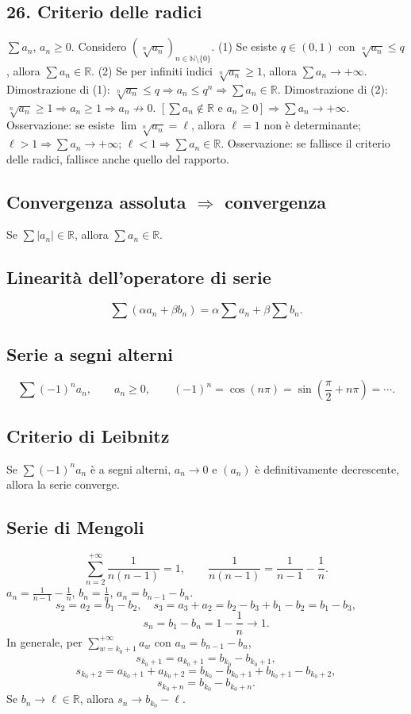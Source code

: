 \documentclass[11pt,a4paper]{article}
\newcommand{\R}{\mathbb R}\newcommand{\N}{\mathbb N}\newcommand{\pagina}[1]{\clearpage}
\begin{document}
\subsection*{26. Criterio delle radici}
$\sum a_n$, $a_n\ge0$. Considero $(\sqrt[n]{a_n})_{n\in\N\setminus\{0\}}$.
(1) Se esiste $q\in(0,1)$ con $\sqrt[n]{a_n}\le q$, allora $\sum a_n\in\R$.
(2) Se per infiniti indici $\sqrt[n]{a_n}\ge1$, allora $\sum a_n\to+\infty$.
Dimostrazione di (1): $\sqrt[n]{a_n}\le q\Rightarrow a_n\le q^n\Rightarrow\sum a_n\in\R$.
Dimostrazione di (2): $\sqrt[n]{a_n}\ge1\Rightarrow a_n\ge1\Rightarrow a_n\not\to0$. $[\sum a_n\notin\R\text{ e }a_n\ge0]\Rightarrow\sum a_n\to+\infty$.
Osservazione: se esiste $\lim\sqrt[n]{a_n}=\ell$, allora $\ell=1$ non è determinante; $\ell>1\Rightarrow\sum a_n\to+\infty$; $\ell<1\Rightarrow\sum a_n\in\R$.
Osservazione: se fallisce il criterio delle radici, fallisce anche quello del rapporto.
\subsection*{Convergenza assoluta $\Rightarrow$ convergenza}
Se $\sum|a_n|\in\R$, allora $\sum a_n\in\R$.
\subsection*{Linearità dell'operatore di serie}
\[\sum(\alpha a_n+\beta b_n)=\alpha\sum a_n+\beta\sum b_n.\]
\subsection*{Serie a segni alterni}
\[\sum(-1)^na_n,\qquad a_n\ge0,\qquad(-1)^n=\cos(n\pi)=\sin\left(\frac\pi2+n\pi\right)=\cdots.\]
\pagina{61}
\subsection*{Criterio di Leibnitz}
Se $\sum(-1)^na_n$ è a segni alterni, $a_n\to0$ e $(a_n)$ è definitivamente decrescente, allora la serie converge.
\subsection*{Serie di Mengoli}
\[\sum_{n=2}^{+\infty}\frac1{n(n-1)}=1,\qquad\frac1{n(n-1)}=\frac1{n-1}-\frac1n.\]
$a_n=\frac1{n-1}-\frac1n$, $b_n=\frac1n$, $a_n=b_{n-1}-b_n$.
\[s_2=a_2=b_1-b_2,\quad s_3=a_3+a_2=b_2-b_3+b_1-b_2=b_1-b_3,\]
\[s_n=b_1-b_n=1-\frac1n\to1.\]
In generale, per $\sum_{w=k_0+1}^{+\infty}a_w$ con $a_n=b_{n-1}-b_n$,
\[s_{k_0+1}=a_{k_0+1}=b_{k_0}-b_{k_0+1},\]
\[s_{k_0+2}=a_{k_0+1}+a_{k_0+2}=b_{k_0}-b_{k_0+1}+b_{k_0+1}-b_{k_0+2},\]
\[s_{k_0+n}=b_{k_0}-b_{k_0+n}.\]
Se $b_n\to\ell\in\R$, allora $s_n\to b_{k_0}-\ell$.
\end{document}
